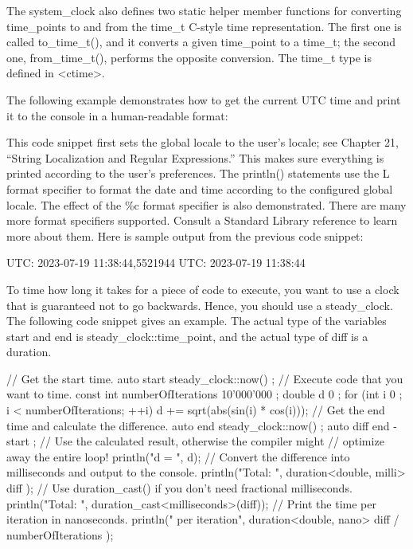The system\_clock also defines two static helper member functions for converting time\_points to and from the time\_t C-style time representation. The first one is called to\_time\_t(), and it converts a given time\_point to a time\_t; the second one, from\_time\_t(), performs the opposite conversion. The time\_t type is defined in <ctime>.


The following example demonstrates how to get the current UTC time and print it to the console in a human-readable format:


This code snippet first sets the global locale to the user’s locale; see Chapter 21, “String Localization and Regular Expressions.” This makes sure everything is printed according to the user’s preferences. The println() statements use the L format specifier to format the date and time according to the configured global locale. The effect of the \%c format specifier is also demonstrated. There are many more format specifiers supported. Consult a Standard Library reference to learn more about them. Here is sample output from the previous code snippet:

\begin{shell}
UTC: 2023-07-19 11:38:44,5521944
UTC: 2023-07-19 11:38:44
\end{shell}


To time how long it takes for a piece of code to execute, you want to use a clock that is guaranteed not to go backwards. Hence, you should use a steady\_clock. The following code snippet gives an example. The actual type of the variables start and end is steady\_clock::time\_point, and the actual type of diff is a duration.

\begin{cpp}
// Get the start time.
auto start { steady_clock::now() };
// Execute code that you want to time.
const int numberOfIterations { 10'000'000 };
double d { 0 };
for (int i { 0 }; i < numberOfIterations; ++i) { d += sqrt(abs(sin(i) * cos(i))); }
// Get the end time and calculate the difference.
auto end { steady_clock::now() };
auto diff { end - start };
// Use the calculated result, otherwise the compiler might
// optimize away the entire loop!
println("d = {}", d);
// Convert the difference into milliseconds and output to the console.
println("Total: {}", duration<double, milli> { diff });
// Use duration_cast() if you don't need fractional milliseconds.
println("Total: {}", duration_cast<milliseconds>(diff));
// Print the time per iteration in nanoseconds.
println("{} per iteration", duration<double, nano> { diff / numberOfIterations });
\end{cpp}

